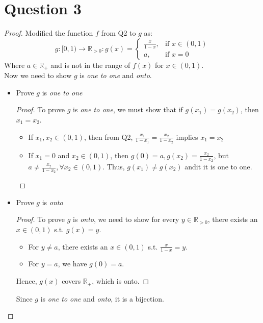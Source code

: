 \documentclass{article}
\begin{document}
\section*{Question 3}
\begin{proof}
    Modified the function $f$ from Q2 to $g$ as:
    \[ g: [0,1) \rightarrow \mathbb{R}_{>0} 
    : g(x) =
        \begin{cases}
            \frac{x}{1-x}, & \text{if } x \in (0, 1) \\
            a, & \text{if } x = 0
        \end{cases}
    \]
    Where $a \in \mathbb{R}_{+}$ and is not in the range of $f(x)$ for $x \in (0,1)$.
    \\
    Now we need to show $g$ is \textit{one to one} and \textit{onto}.
    \begin{itemize}
        \item Prove $g$ is \textit{one to one}
        \begin{proof}
            To prove $g$ is \textit{one to one}, we must show that if $g(x_1) = g(x_2)$, then $x_1 = x_2$.
            \\
            \begin{itemize}
                \item If $x_1, x_2 \in (0,1)$, then from Q2, $\frac{x_1}{1-x_1} = \frac{x_2}{1-x_2}$ implies $x_1 = x_2$
                \item If $x_1 = 0$ and $x_2 \in (0,1)$, then $g(0) = a, g(x_2) = \frac{x_2}{1-x_2}$, but $a \neq \frac{x_2}{1-x_2}, \forall x_2 \in (0,1)$.
                Thus, $g(x_1) \neq g(x_2)$ andit it is one to one.
            \end{itemize}
        \end{proof}
        \item Prove $g$ is \textit{onto}
        \begin{proof}
            To prove $g$ is \textit{onto}, we need to show for every $y \in \mathbb{R}_{>0}$, there exists an $x \in (0,1)$ s.t. $g(x) = y$.
            \\
            \begin{itemize}
                \item For $y \neq a$, there exists an $x \in (0,1)$ s.t. $\frac{x}{1-x} = y$.
                \item For $y = a$, we have $g(0) = a$.
            \end{itemize}
            Hence, $g(x)$ covers $\mathbb{R}_{+}$, which is onto.
        \end{proof}
        Since $g$ is \textit{one to one} and \textit{onto}, it is a bijection.
    \end{itemize}
\end{proof}
\end{document}
